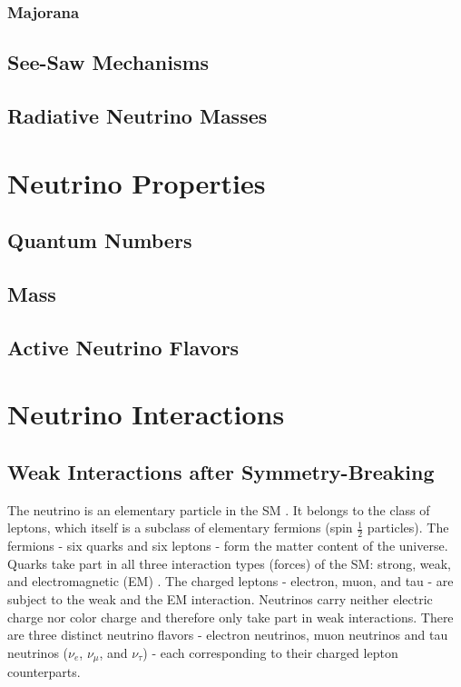 \subsubsection{Majorana}


\subsection{See-Saw Mechanisms}

\subsection{Radiative Neutrino Masses}


\section{Neutrino Properties}

\subsection{Quantum Numbers}

\subsection{Mass}

\subsection{Active Neutrino Flavors}


\section{Neutrino Interactions} 

\subsection{Weak Interactions after Symmetry-Breaking}

The neutrino is an elementary particle in the SM .
It belongs to the class of leptons, which itself is a subclass of elementary fermions (spin ${\frac{1}{2}}$ particles).
The fermions - six quarks and six leptons - form the matter content of the universe.
Quarks take part in all three interaction types (forces) of the SM: strong, weak, and electromagnetic (EM) .
The charged leptons - electron, muon, and tau - are subject to the weak and the EM interaction.
Neutrinos carry neither electric charge nor color charge and therefore only take part in weak interactions.
There are three distinct neutrino flavors - electron neutrinos, muon neutrinos and tau neutrinos ($\nu_e$, $\nu_{\mu}$, and $\nu_{\tau}$)  - each corresponding to their charged lepton counterparts.

